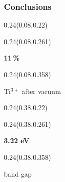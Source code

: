 \documentclass[aspectratio=169]{beamer}
\begin{document}
\begin{frame}[t]
  \frametitle{Conclusions}

%
\begin{textblock}{0.24}(0.08,0.22)
\end{textblock}

\begin{textblock}{0.24}(0.08,0.261)
{\centering\fontsize{26}{31}\selectfont \textcolor[HTML]{FFFFFF}{\textbf{11\,\%}}\par}
\end{textblock}

\begin{textblock}{0.24}(0.08,0.358)
{\centering\fontsize{12}{14}\selectfont \textcolor[HTML]{FFFFFF}{Ti$^{3+}$ after vacuum}\par}
\end{textblock}

%
\begin{textblock}{0.24}(0.38,0.22)
\end{textblock}

\begin{textblock}{0.24}(0.38,0.261)
{\centering\fontsize{26}{31}\selectfont \textcolor[HTML]{FFFFFF}{\textbf{3.22 eV}}\par}
\end{textblock}

\begin{textblock}{0.24}(0.38,0.358)
{\centering\fontsize{12}{14}\selectfont \textcolor[HTML]{FFFFFF}{band gap}\par}
\end{textblock}


\end{frame}
\end{document}
